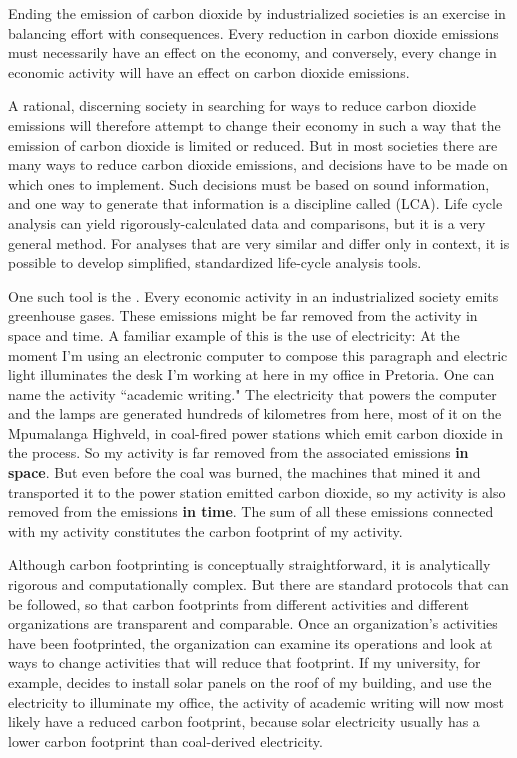 Ending the emission of carbon dioxide by industrialized societies is an exercise
in balancing effort with consequences. Every reduction in carbon dioxide
emissions must necessarily have an effect on the economy, and conversely, every
change in economic activity will have an effect on carbon dioxide emissions.

A rational, discerning society in searching for ways to reduce carbon dioxide emissions
will therefore attempt to change their economy in such a way that the emission
of carbon dioxide is limited or reduced. But in most societies there are many
ways to reduce carbon dioxide emissions, and decisions have to be made on which
ones to implement. Such decisions must be based on sound information, and one
way to generate that information is a discipline called  (LCA). Life cycle analysis can yield rigorously-calculated data and
comparisons, but it is a very general method. For analyses that are very similar
and differ only in context, it is possible to develop simplified, standardized
life-cycle analysis tools.

One such tool is the . Every economic activity in an
industrialized society emits greenhouse gases.
These emissions might  be far removed from the activity in space and time. A
familiar example of this is the use of electricity: At the moment I'm using an
electronic computer to compose this paragraph and electric light illuminates the
desk I'm working at here in my office in Pretoria. One can name the activity
``academic writing." The electricity that powers the computer and the lamps are
generated hundreds of kilometres from here, most of it on the Mpumalanga
Highveld, in coal-fired power stations which emit carbon dioxide in the
process. So my activity is far removed from the associated emissions \textbf{in
space}. But even before the coal was burned, the machines that mined it and
transported it to the power station emitted carbon dioxide, so my activity is
also removed from the emissions \textbf{in time}. The sum of all these emissions
connected with my activity constitutes the carbon footprint of my activity.

Although carbon footprinting is conceptually straightforward, it is analytically
rigorous and computationally complex. But there are standard protocols
\autocite{WRI2004} that can be followed, so that carbon footprints from
different activities and different organizations are transparent and comparable.
Once an organization's activities have been footprinted, the organization can
examine its operations and look at ways to change activities that will reduce
that footprint. If my university, for example, decides to install solar
panels on the roof of my building, and use the electricity to illuminate my
office, the activity of academic writing will now most likely have a reduced
carbon footprint, because solar electricity usually has a lower carbon
footprint than coal-derived electricity.

